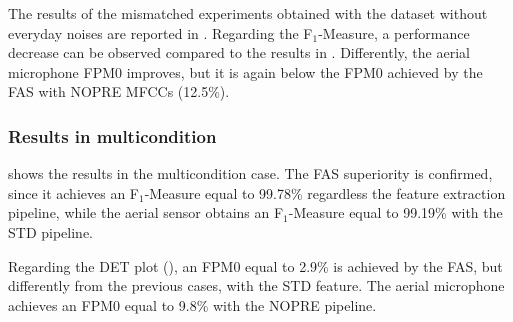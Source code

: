 The results of the mismatched experiments obtained with the dataset without everyday noises are reported in . Regarding the F$_1$-Measure, a performance decrease can be observed compared to the results in . Differently, the aerial microphone FPM0 improves, but it is again below the FPM0 achieved by the FAS with NOPRE MFCCs (12.5\%).


\subsubsection{Results in multicondition}
 shows the results in the multicondition case. The FAS superiority is confirmed, since it achieves an F$_1$-Measure equal to 99.78\% regardless the feature extraction pipeline, while the aerial sensor obtains an F$_1$-Measure equal to 99.19\% with the STD pipeline.

Regarding the DET plot (), an FPM0 equal to 2.9\% is achieved by the FAS, but differently from the previous cases, with the STD feature. The aerial microphone achieves an FPM0 equal to 9.8\% with the NOPRE pipeline.

